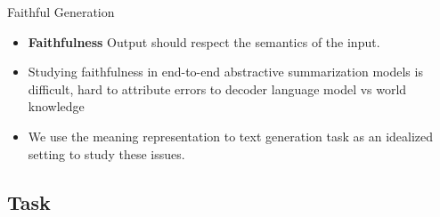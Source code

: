 
%
%
%
%
%
%

\begin{frame}{Faithful Generation}

\begin{itemize}

        \item \textbf{Faithfulness} Output should respect the semantics of the input. 
\vspace{20pt}
\item Studying faithfulness in  end-to-end abstractive summarization models
is difficult, hard to attribute errors to decoder language model vs world knowledge
\vspace{20pt}
\item We use the meaning representation to text generation task
as an idealized setting to study these issues.
\end{itemize}

\end{frame}

\subsection{Task}

